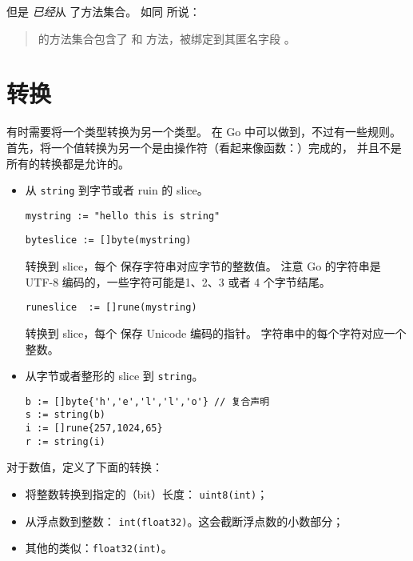 但是  \emph{已经}从  了方法集合。
如同 \cite{go_spec} 所说：
\begin{quote}
 的方法集合包含了
 和  方法，被绑定到其匿名字段 。
\end{quote}

\section{转换}
\label{sec:conversions}
有时需要将一个类型转换为另一个类型。
在 Go 中可以做到，不过有一些规则。首先，将一个值转换为另一个是由操作符（看起来像函数：）完成的，
并且不是所有的转换都是允许的。

\begin{table}[H]
\begin{center}
\caption[Valid conversions]{合法的转换， 
\lstinline{float64} 同 \lstinline{float32} 类似。注意，
为了适配表格的显示，float32 被简写为~flt32。}
\label{tab:convesion}

\end{center}
\end{table}

\begin{itemize}
\item{
从 \lstinline{string} 到字节或者 ruin 的 slice。
\begin{lstlisting}
mystring := "hello this is string"
\end{lstlisting}

\begin{lstlisting}
byteslice := []byte(mystring)
\end{lstlisting}
转换到  slice，每个  保存字符串对应字节的整数值。
注意 Go 的字符串是 UTF-8 编码的，一些字符可能是1、2、3 或者 4 个字节结尾。
\begin{lstlisting}
runeslice  := []rune(mystring)
\end{lstlisting}
转换到  slice，每个  保存 Unicode 编码的指针。
字符串中的每个字符对应一个整数。
}
\item{
从字节或者整形的 slice 到 \lstinline{string}。
\begin{lstlisting}
b := []byte{'h','e','l','l','o'} // 复合声明
s := string(b)
i := []rune{257,1024,65} 
r := string(i)
\end{lstlisting}
}
\end{itemize}
对于数值，定义了下面的转换：
\begin{itemize}
\item{将整数转换到指定的（bit）长度： 
\lstinline{uint8(int)}；}
\item{从浮点数到整数：
\lstinline{int(float32)}。这会截断浮点数的小数部分；}
\item{其他的类似：\lstinline{float32(int)}。}
\end{itemize}

